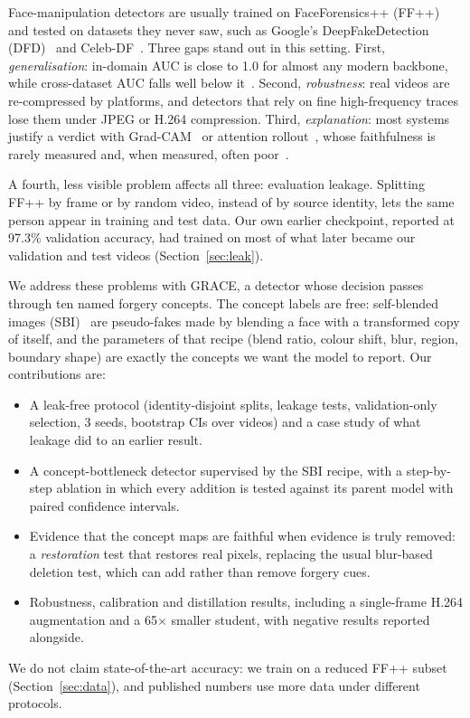 \documentclass[conference]{IEEEtran}
\begin{document}
Face-manipulation detectors are usually trained on FaceForensics++ (FF++)~\cite{ffpp} and tested on datasets they
never saw, such as Google's DeepFakeDetection (DFD)~\cite{dfd} and Celeb-DF~\cite{celebdf}. Three gaps stand out
in this setting. First, \emph{generalisation}: in-domain AUC is close to 1.0 for almost any modern backbone, while
cross-dataset AUC falls well below it~\cite{deepfakebench,df40}. Second, \emph{robustness}: real videos are
re-compressed by platforms, and detectors that rely on fine high-frequency traces lose them under JPEG or H.264
compression. Third, \emph{explanation}: most systems justify a verdict with Grad-CAM~\cite{gradcam} or attention
rollout~\cite{rollout}, whose faithfulness is rarely measured and, when measured, often poor~\cite{tsigos}.

A fourth, less visible problem affects all three: evaluation leakage. Splitting FF++ by frame or by random video,
instead of by source identity, lets the same person appear in training and test data. Our own earlier checkpoint,
reported at 97.3\% validation accuracy, had trained on most of what later became our validation and test videos
(Section~\ref{sec:leak}).

We address these problems with GRACE, a detector whose decision passes through ten named forgery concepts. The
concept labels are free: self-blended images (SBI)~\cite{sbi} are pseudo-fakes made by blending a face with a
transformed copy of itself, and the parameters of that recipe (blend ratio, colour shift, blur, region, boundary
shape) are exactly the concepts we want the model to report. Our contributions are:
\begin{itemize}
\item A leak-free protocol (identity-disjoint splits, leakage tests, validation-only selection, 3 seeds, bootstrap
CIs over videos) and a case study of what leakage did to an earlier result.
\item A concept-bottleneck detector supervised by the SBI recipe, with a step-by-step ablation in which every
addition is tested against its parent model with paired confidence intervals.
\item Evidence that the concept maps are faithful when evidence is truly removed: a \emph{restoration} test that
restores real pixels, replacing the usual blur-based deletion test, which can add rather than remove forgery cues.
\item Robustness, calibration and distillation results, including a single-frame H.264 augmentation and a
65$\times$ smaller student, with negative results reported alongside.
\end{itemize}
We do not claim state-of-the-art accuracy: we train on a reduced FF++ subset (Section~\ref{sec:data}), and published
numbers use more data under different protocols.
\end{document}
